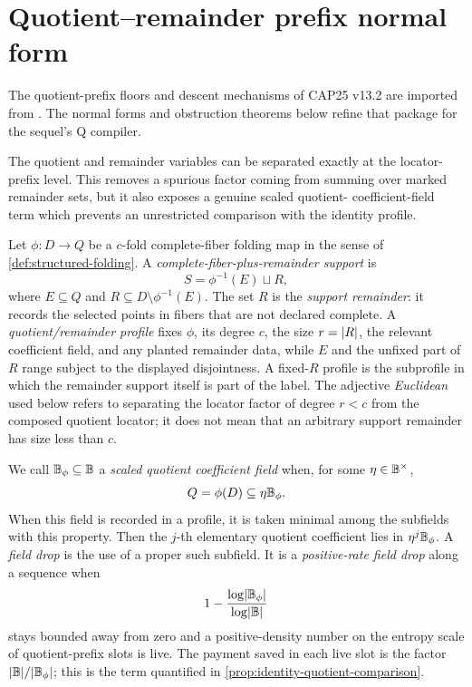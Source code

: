 \documentclass[11pt,a4paper]{amsart}
\numberwithin{equation}{section}
\theoremstyle{remark}
\begin{document}
\section{Quotient--remainder prefix normal form}\label{sec:quotient-remainder-profiles}
The quotient-prefix floors and descent mechanisms of CAP25 v13.2 are imported from \cite[Secs.~3, 8, and 14]{CAP25v132}.  The normal forms and obstruction theorems below refine that package for the sequel's Q compiler.

The quotient and remainder variables can be separated exactly at the
locator-prefix level.  This removes a spurious factor coming from summing
over marked remainder sets, but it also exposes a genuine scaled quotient-
coefficient-field term which prevents an unrestricted comparison with the
identity profile.

\begin{definition}
\label{def:quotient-remainder-profile}
Let \(\phi:D\to Q\) be a \(c\)-fold complete-fiber folding map in the
sense of \cref{def:structured-folding}.  A
\emph{complete-fiber-plus-remainder support} is
\[
                  S=\phi^{-1}(E)\sqcup R,
\]
where \(E\subseteq Q\) and
\(R\subseteq D\setminus\phi^{-1}(E)\).  The set \(R\) is the
\emph{support remainder}: it records the selected points in fibers that
are not declared complete.  A \emph{quotient/remainder profile} fixes
\(\phi\), its degree \(c\), the size \(r=\lvert R\rvert\), the relevant
coefficient field, and any planted remainder data, while \(E\) and the
unfixed part of \(R\) range subject to the displayed disjointness.
A fixed-\(R\) profile is the subprofile in which the remainder support
itself is part of the label.  The adjective \emph{Euclidean} used below
refers to separating the locator factor of degree \(r<c\) from the
composed quotient locator; it does not mean that an arbitrary support
remainder has size less than \(c\).

We call \(\mathbb B_\phi\subseteq\mathbb B\) a \emph{scaled quotient coefficient
field} when, for some \(\eta\in\mathbb B^\times\),
\[
                         Q=\phi(D)\subseteq\eta\mathbb B_\phi .
\]
When this field is recorded in a profile, it is taken minimal among the
subfields with this property.
Then the \(j\)-th elementary quotient coefficient lies in
\(\eta^j\mathbb B_\phi\).  A \emph{field drop} is the use of a proper such
subfield.  It is a \emph{positive-rate field drop} along a sequence when
\[
       1-\frac{\log\lvert \mathbb B_\phi\rvert}{\log\lvert \mathbb B\rvert}
\]
stays bounded away from zero and a positive-density number on the
entropy scale of quotient-prefix slots is live.  The payment saved in
each live slot is the factor \(\lvert \mathbb B\rvert/\lvert \mathbb B_\phi\rvert\); this is the term
quantified in \cref{prop:identity-quotient-comparison}.
\end{definition}
\end{document}
